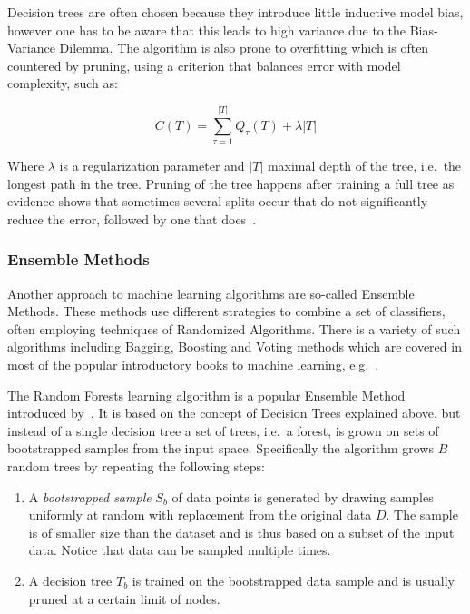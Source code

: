 Decision trees are often chosen because they introduce little inductive model bias, however one has to be aware that this leads to high variance due to the Bias-Variance Dilemma. The algorithm is also prone to overfitting which is often countered by pruning, using a criterion that balances error with model complexity, such as:

\begin{equation}
  C(T) = \sum_{\tau=1}^{|T|} Q_{\tau}(T) + \lambda |T|
\end{equation}

Where $\lambda$ is a regularization parameter and $|T|$ maximal depth of the tree, i.e.\ the longest path in the tree. Pruning of the tree happens after training a full tree as evidence shows that sometimes several splits occur that do not significantly reduce the error, followed by one that does~\cite[Chapter 14.4, p.~664]{Bishop:2006aa}.

\subsubsection{Ensemble Methods}
\label{subs:Ensemble Methods}

Another approach to machine learning algorithms are so-called \glspl{Ensemble Method}. These methods use different strategies to combine a set of classifiers, often employing techniques of \glspl{Randomized Algorithm}. There is a variety of such algorithms including \gls{Bagging}, \gls{Boosting} and \gls{Voting} methods which are covered in most of the popular introductory books to machine learning, e.g.~\cite{Bishop:2006aa}.

The Random Forests learning algorithm is a popular \gls{Ensemble Method} introduced by~\cite{Breiman:aa}. It is based on the concept of Decision Trees explained above, but instead of a single decision tree a set of trees, i.e.\ a forest, is grown on sets of bootstrapped samples from the input space. Specifically the algorithm grows $B$ random trees by repeating the following steps:

\begin{enumerate}
  \item A \emph{bootstrapped sample} $S_b$ of data points is generated by drawing samples uniformly at random with replacement from the original data $D$. The sample is of smaller size than the dataset and is thus based on a subset of the input data. Notice that data can be sampled multiple times.
  \item A decision tree $T_b$ is trained on the bootstrapped data sample and is usually pruned at a certain limit of nodes.
\end{enumerate}

